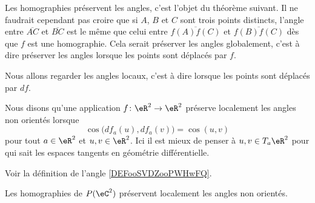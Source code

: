 \begin{normaltext}
    Les homographies préservent les angles, c'est l'objet du théorème suivant. Il ne faudrait cependant pas croire que si \( A\), \( B\) et \( C\) sont trois points distincts, l'angle entre \( \overline{ AC }\) et \( \overline{ BC }\) est le même que celui entre \( \overline{ f(A)f(C) }\) et \( \overline{ f(B)f(C) }\) dès que \( f\) est une homographie. Cela serait préserver les angles globalement, c'est à dire préserver les angles lorsque les points sont déplacés par \( f\).

    Nous allons regarder les angles locaux, c'est à dire lorsque les points sont déplacés par \( df\).
\end{normaltext}

\begin{definition}
    Nous disons qu'une application \( f\colon \eR^2\to \eR^2\) préserve localement les angles non orientés lorsque
    \begin{equation}
        \cos\big( df_a(u),df_a(v) \big)=\cos(u,v)
    \end{equation}
    pour tout \( a\in \eR^2\) et \( u,v\in \eR^2\). Ici il est mieux de penser à \( u,v\in T_a\eR^2\) pour qui sait les espaces tangents en géométrie différentielle.
\end{definition}
Voir la définition de l'angle \ref{DEFooSVDZooPWHwFQ}.

\begin{theorem}
    Les homographies de \( P(\eC^2)\) préservent localement les angles non orientés.
\end{theorem}

